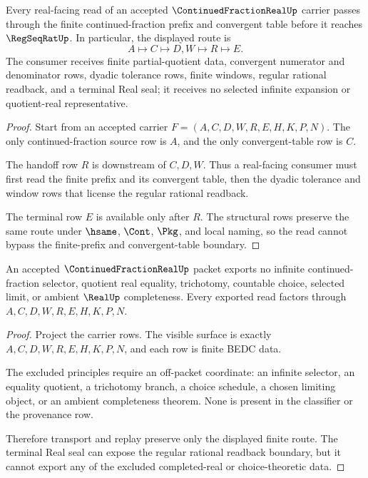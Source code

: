 \begin{theorem}
\label{thm:continued-fraction-real-convergent-handoff}
Every real-facing read of an accepted $\ContinuedFractionRealUp$ carrier passes through the finite continued-fraction prefix and convergent table before it reaches $\RegSeqRatUp$. In particular, the displayed route is
$$
A \longmapsto C \longmapsto D,W \longmapsto R \longmapsto E .
$$
The consumer receives finite partial-quotient data, convergent numerator and denominator rows, dyadic tolerance rows, finite windows, regular rational readback, and a terminal Real seal; it receives no selected infinite expansion or quotient-real representative.
\end{theorem}
\begin{proof}
Start from an accepted carrier $F=(A,C,D,W,R,E,H,K,P,N)$. The only continued-fraction source row is $A$, and the only convergent-table row is $C$.

The handoff row $R$ is downstream of $C,D,W$. Thus a real-facing consumer must first read the finite prefix and its convergent table, then the dyadic tolerance and window rows that license the regular rational readback.

The terminal row $E$ is available only after $R$. The structural rows preserve the same route under $\hsame$, $\Cont$, $\Pkg$, and local naming, so the read cannot bypass the finite-prefix and convergent-table boundary.
\end{proof}

\begin{theorem}
\label{thm:continued-fraction-real-seal-nonescape}
An accepted $\ContinuedFractionRealUp$ packet exports no infinite continued-fraction selector, quotient real equality, trichotomy, countable choice, selected limit, or ambient $\RealUp$ completeness. Every exported read factors through $A,C,D,W,R,E,H,K,P,N$.
\end{theorem}
\begin{proof}
Project the carrier rows. The visible surface is exactly $A,C,D,W,R,E,H,K,P,N$, and each row is finite BEDC data.

The excluded principles require an off-packet coordinate: an infinite selector, an equality quotient, a trichotomy branch, a choice schedule, a chosen limiting object, or an ambient completeness theorem. None is present in the classifier or the provenance row.

Therefore transport and replay preserve only the displayed finite route. The terminal Real seal can expose the regular rational readback boundary, but it cannot export any of the excluded completed-real or choice-theoretic data.
\end{proof}

